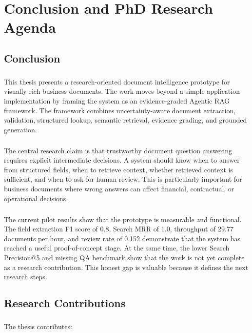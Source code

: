 \chapter{Conclusion and PhD Research Agenda}
\label{chap:conclusion}

\section{Conclusion}
\paragraph{} This thesis presents a research-oriented document intelligence prototype for visually rich business documents. The work moves beyond a simple application implementation by framing the system as an evidence-graded Agentic RAG framework. The framework combines uncertainty-aware document extraction, validation, structured lookup, semantic retrieval, evidence grading, and grounded generation.

\paragraph{} The central research claim is that trustworthy document question answering requires explicit intermediate decisions. A system should know when to answer from structured fields, when to retrieve context, whether retrieved context is sufficient, and when to ask for human review. This is particularly important for business documents where wrong answers can affect financial, contractual, or operational decisions.

\paragraph{} The current pilot results show that the prototype is measurable and functional. The field extraction F1 score of 0.8, Search MRR of 1.0, throughput of 29.77 documents per hour, and review rate of 0.152 demonstrate that the system has reached a useful proof-of-concept stage. At the same time, the lower Search Precision@5 and missing QA benchmark show that the work is not yet complete as a research contribution. This honest gap is valuable because it defines the next research steps.

\section{Research Contributions}
\paragraph{} The thesis contributes:

